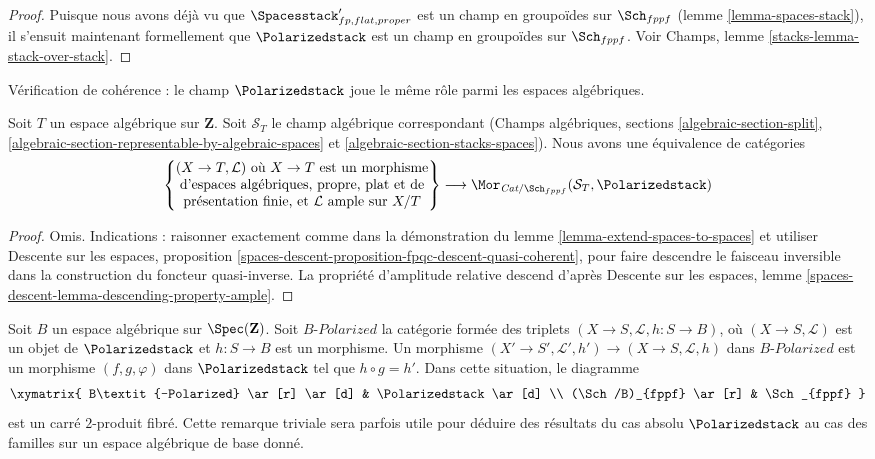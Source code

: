\begin{proof}
\medskip\noindent
Puisque nous avons déjà vu que $\Spacesstack'_{fp, flat, proper}$ est un champ
en groupoïdes sur $\Sch_{fppf}$ (lemme \ref{lemma-spaces-stack}), il s'ensuit
maintenant formellement que $\Polarizedstack$ est un champ en groupoïdes sur
$\Sch_{fppf}$. Voir Champs, lemme \ref{stacks-lemma-stack-over-stack}.
\end{proof}

\noindent
Vérification de cohérence : le champ $\Polarizedstack$ joue le même rôle parmi
les espaces algébriques.

\begin{lemma}
\label{lemma-extend-polarized-to-spaces}
Soit $T$ un espace algébrique sur $\mathbf{Z}$. Soit $\mathcal{S}_T$
le champ algébrique correspondant (Champs algébriques, sections
\ref{algebraic-section-split},
\ref{algebraic-section-representable-by-algebraic-spaces} et
\ref{algebraic-section-stacks-spaces}).
Nous avons une équivalence de catégories
$$
\left\{
\begin{matrix}
(X \to T, \mathcal{L})\text{ où }X \to T\text{ est un morphisme}\\
\text{d'espaces algébriques, propre, plat et de}\\
\text{présentation finie, et }\mathcal{L}\text{ ample sur }X/T
\end{matrix}
\right\}
\longrightarrow
\Mor_{\textit{Cat}/\Sch_{fppf}}(\mathcal{S}_T, \Polarizedstack)
$$
\end{lemma}

\begin{proof}
Omis. Indications : raisonner exactement comme dans la démonstration du
lemme \ref{lemma-extend-spaces-to-spaces} et utiliser
Descente sur les espaces, proposition
\ref{spaces-descent-proposition-fpqc-descent-quasi-coherent}, pour faire
descendre le faisceau inversible dans la construction du foncteur
quasi-inverse. La propriété d'amplitude relative descend d'après
Descente sur les espaces, lemme
\ref{spaces-descent-lemma-descending-property-ample}.
\end{proof}

\begin{remark}
\label{remark-polarized-base-change}
Soit $B$ un espace algébrique sur $\Spec(\mathbf{Z})$.
Soit $B\textit{-Polarized}$ la catégorie formée des triplets
$(X \to S, \mathcal{L}, h : S \to B)$, où
$(X \to S, \mathcal{L})$ est un objet de $\Polarizedstack$ et
$h : S \to B$ est un morphisme.
Un morphisme
$(X' \to S', \mathcal{L}', h') \to (X \to S, \mathcal{L}, h)$ dans
$B\textit{-Polarized}$ est un morphisme $(f, g, \varphi)$ dans
$\Polarizedstack$ tel que $h \circ g = h'$.
Dans cette situation, le diagramme
$$
\xymatrix{
B\textit{-Polarized} \ar[r] \ar[d] & \Polarizedstack \ar[d] \\
(\Sch/B)_{fppf} \ar[r] & \Sch_{fppf}
}
$$
est un carré $2$-produit fibré. Cette remarque triviale sera parfois utile
pour déduire des résultats du cas absolu $\Polarizedstack$ au cas des familles
sur un espace algébrique de base donné.
\end{remark}

